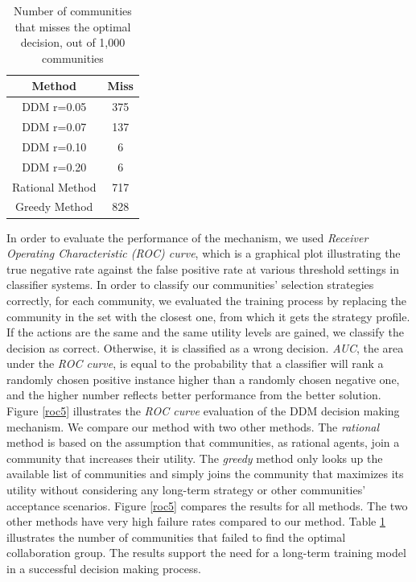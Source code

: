 \documentclass[10pt,journal,cspaper,compsoc]{IEEEtran}
\begin{document}
\begin{table}[ht]
\caption{Number of communities that misses the optimal decision, out of 1,000 communities} %
\centering %
\begin{tabular}{|c|c|} %
\hline %
 Method&Miss \\ [0.5ex] %
\hline %
 DDM r=0.05& 375 \\ %
 DDM r=0.07& 137 \\
 DDM r=0.10& 6 \\
 DDM r=0.20& 6 \\
Rational Method& 717 \\
Greedy Method& 828 \\ [1ex] %
\hline %
\end{tabular}
\label{fail_rate} %
\end{table}


In order to evaluate the performance of the mechanism, we used \emph{Receiver Operating Characteristic (ROC) curve}, which is a graphical plot illustrating the true negative rate against the false positive rate at various threshold settings in classifier systems. In order to classify our communities' selection strategies correctly, for each community, we evaluated the training process by replacing the community in the set with the closest one, from which it gets the strategy profile. If the actions are the same and the same utility levels are gained, we classify the decision as correct. Otherwise, it is classified as a wrong decision. \emph{AUC}, the area under the \emph{ROC curve}, is equal to the probability that a classifier will rank a randomly chosen positive instance higher than a randomly chosen negative one, and the higher number reflects better performance from the better solution.  Figure \ref{roc5} illustrates the \emph{ROC curve} evaluation of the DDM decision making mechanism. We compare our method with two other methods. The \emph{rational} method is based on the assumption that communities, as rational agents, join a community that increases their utility. The \emph{greedy} method only looks up the available list of communities and simply joins the community that maximizes its utility without considering any long-term strategy or  other communities' acceptance scenarios. Figure \ref{roc5} compares the results for all methods. The two other methods have very high failure rates compared to our method. Table \ref{fail_rate} illustrates the number of communities that failed to find the optimal collaboration group. The results support the need for a long-term training model in a successful decision making process.
\end{document}
